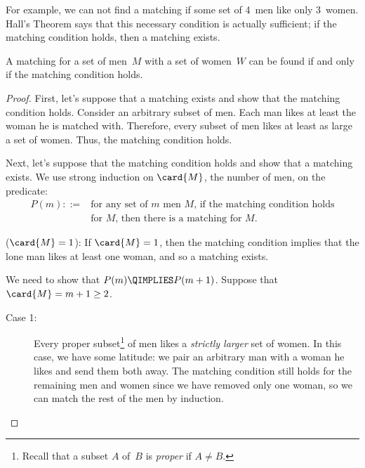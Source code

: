 \medskip

For example, we can not find a matching if some set of 4~men like only
3~women.  Hall's Theorem says that this necessary condition is
actually sufficient; if the matching condition holds, then a matching
exists.

\begin{theorem}\label{thm:matching}
A matching for a set of men~$M$ with a set of women~$W$ can be found
if and only if the matching condition holds.
\end{theorem}

\begin{proof}
First, let's suppose that a matching exists and show that the matching
condition holds.  Consider an arbitrary subset of men.  Each man likes
at least the woman he is matched with.  Therefore, every subset of men
likes at least as large a set of women.  Thus, the matching condition
holds.

Next, let's suppose that the matching condition holds and show that a
matching exists.  We use strong induction on $\card{M}$, the number of
men, on the predicate:
\begin{align*}
    P(m) ::={} & \text{for any set of $m$ men~$M$, if the matching
      condition holds} \\
             & \text{for~$M$, then there is a matching for~$M$.}
\end{align*}

 ($\card{M}=1$): If $\card{M} = 1$, then the
matching condition implies that the lone man likes at least one woman,
and so a matching exists.

 We need to show that $P(m) \QIMPLIES
P(m + 1)$.  Suppose that $\card{M} = m + 1 \ge 2$.
\begin{description}

\item[Case 1:] Every proper subset\footnote{Recall that a subset $A$
  of~$B$ is \emph{proper} if $A \ne B$.} of men likes a \emph{strictly
  larger} set of women.  In this case, we have some latitude: we pair
  an arbitrary man with a woman he likes and send them both away.  The
  matching condition still holds for the remaining men and women since
  we have removed only one woman, so we can match the rest of the
  men by induction.


\end{description}
\end{proof}

